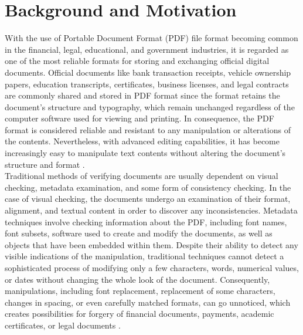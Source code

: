 \section{Background and Motivation}

With the use of Portable Document Format (PDF) file format becoming common in the financial, legal, educational, and government industries, it is regarded as one of the most reliable formats for storing and exchanging official digital documents. Official documents like bank transaction receipts, vehicle ownership papers, education transcripts, certificates, business licenses, and legal contracts are commonly shared and stored in PDF format since the format retains the document's structure and typography, which remain unchanged regardless of the computer software used for viewing and printing. In consequence, the PDF format is considered reliable and resistant to any manipulation or alterations of the contents. Nevertheless, with advanced editing capabilities, it has become increasingly easy to manipulate text contents without altering the document's structure and format \cite{Qu2023TamperedText}.\\

\noindent Traditional methods of verifying documents are usually dependent on visual checking, metadata examination, and some form of consistency checking. In the case of visual checking, the documents undergo an examination of their format, alignment, and textual content in order to discover any inconsistencies. Metadata techniques involve checking information about the PDF, including font names, font subsets, software used to create and modify the documents, as well as objects that have been embedded within them. Despite their ability to detect any visible indications of the manipulation, traditional techniques cannot detect a sophisticated process of modifying only a few characters, words, numerical values, or dates without changing the whole look of the document. Consequently, manipulations, including font replacement, replacement of some characters, changes in spacing, or even carefully matched formats, can go unnoticed, which creates possibilities for forgery of financial documents, payments, academic certificates, or legal documents \cite{Kumar2025RealTimeFraud}.\\

